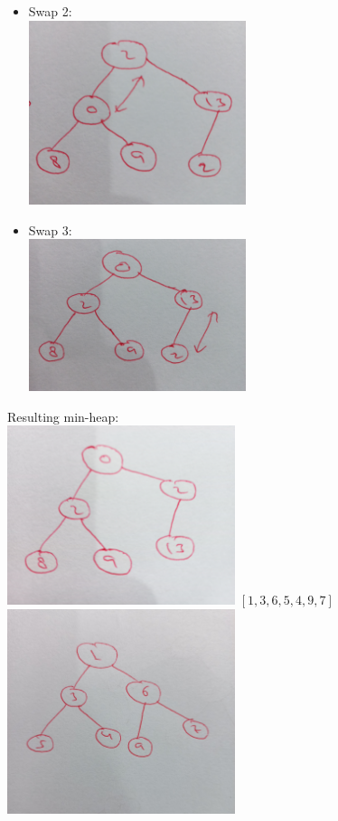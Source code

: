 \documentclass[12pt,twoside]{article}
\begin{document}
\begin{problems}
\begin{problemparts}
\begin{itemize}
    \item Swap 2: \\
    \includegraphics[width=0.5\textwidth]{2c2.jpg}
    \item Swap 3: \\
    \includegraphics[width=0.5\textwidth]{2c3.jpg}
\end{itemize}
Resulting min-heap: \\
\includegraphics[width=0.5\textwidth]{2c4.jpg}
\newpage
\problempart %
$[1, 3, 6, 5, 4, 9, 7]$ \\
\includegraphics[width=0.5\textwidth]{2d.jpg} \\
\end{problemparts}


\end{problems}
\end{document}
